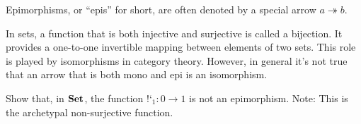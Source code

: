 \documentclass[DaoFP]{subfiles}
\begin{document}
Epimorphisms, or ``epis'' for short, are often denoted by a special arrow $a \twoheadrightarrow b$.

In sets, a function that is both injective and surjective is called a bijection. It provides a one-to-one invertible mapping between elements of two sets. This role is played by isomorphisms in category theory. However, in general it's not true that an arrow that is both mono and epi is an isomorphism.

\begin{exercise}
Show that, in $\mathbf{Set}$, the function $\mbox{!`}_1 \colon 0 \to 1$ is not an epimorphism. Note: This is the archetypal non-surjective function.
\end{exercise}
\end{document}

